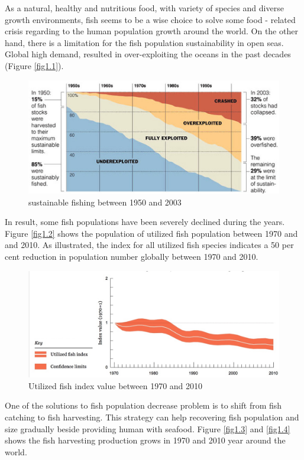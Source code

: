 As a natural, healthy and nutritious food, with variety of species and diverse growth environments, fish seems to be a wise choice to solve some food - related crisis regarding to the human population growth around the world. On the other hand, there is a limitation for the fish population sustainability in open seas. Global high demand, resulted in over-exploiting the oceans in the past decades (Figure \ref{fig1.1}).

\begin{figure}[H]
	\includegraphics[width=\textwidth]{over.jpg}
	\caption{sustainable fishing between 1950 and 2003}
\end{figure}
\label{fig1.1} 

In result, some fish populations have been severely  declined during the years. Figure \ref{fig1.2} shows the population of utilized fish population between 1970 and  and 2010. As illustrated, the index for all utilized fish species indicates a 50 per cent reduction in population number globally between 1970 and 2010.

\begin{figure}[H]
	\includegraphics[width=\textwidth]{utilizedfish.jpeg}
	\caption{Utilized fish index value between 1970 and 2010}
\end{figure}
\label{fig1.2} 

One of the solutions to fish population decrease problem is to shift from fish catching to fish harvesting. This strategy can help recovering fish population and size gradually beside providing human with seafood.  Figure \ref{fig1.3} and \ref{fig1.4} shows the fish harvesting production grows in 1970 and 2010 year around the world.

